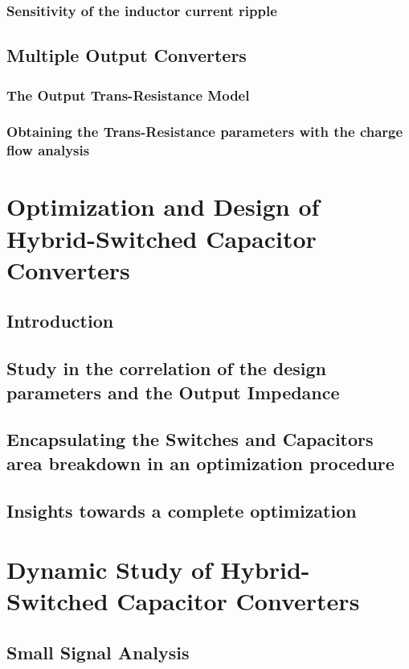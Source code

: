 \subsection{Sensitivity of the inductor current ripple}

\section{Multiple Output Converters}
\subsection{The Output Trans-Resistance Model}
\subsection{Obtaining the Trans-Resistance parameters with the charge flow analysis }



\chapter[Optimization and Design]{Optimization and Design of Hybrid-Switched Capacitor Converters}
\section{Introduction}
\section{Study in the correlation of the design parameters and the Output Impedance}
\section{Encapsulating the Switches and Capacitors area breakdown in an optimization procedure}
\section{Insights towards a complete optimization}

\chapter[Dynamic Study]{Dynamic Study of Hybrid-Switched Capacitor Converters}
\section{Small Signal Analysis}


\clearpage

 